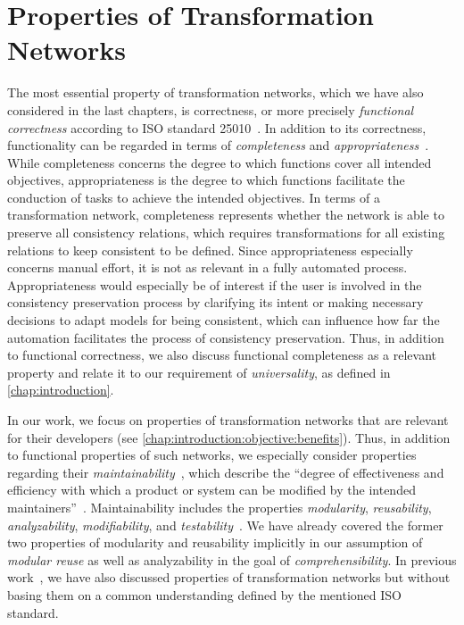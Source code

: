 \section{Properties of Transformation Networks}
\label{chap:classification:properties}

The most essential property of transformation networks, which we have also considered in the last chapters, is correctness, or more precisely \emph{functional correctness} according to ISO standard 25010~\cite[p.~11]{iso25010}.
In addition to its correctness, functionality can be regarded in terms of \emph{completeness} and \emph{appropriateness}~\cite[p.~11]{iso25010}.
While completeness concerns the degree to which functions cover all intended objectives, appropriateness is the degree to which functions facilitate the conduction of tasks to achieve the intended objectives.
In terms of a transformation network, completeness represents whether the network is able to preserve all consistency relations, which requires transformations for all existing relations to keep consistent to be defined.
Since appropriateness especially concerns manual effort, it is not as relevant in a fully automated process. Appropriateness would especially be of interest if the user is involved in the consistency preservation process by clarifying its intent or making necessary decisions to adapt models for being consistent, which can influence how far the automation facilitates the process of consistency preservation.
Thus, in addition to functional correctness, we also discuss functional completeness as a relevant property and relate it to our requirement of \emph{universality}, as defined in \autoref{chap:introduction}.

In our work, we focus on properties of transformation networks that are relevant for their developers (see \autoref{chap:introduction:objective:benefits}).
Thus, in addition to functional properties of such networks, we especially consider properties regarding their \emph{maintainability}~\cite[Tab.~2]{iso25010}, which describe the \enquote{degree of effectiveness and efficiency with which a product or system can be modified by the intended maintainers}~\cite[p.~14]{iso25010}.
Maintainability includes the properties \emph{modularity}, \emph{reusability}, \emph{analyzability}, \emph{modifiability}, and \emph{testability}~\cite[pp.~14]{iso25010}.
We have already covered the former two properties of modularity and reusability implicitly in our assumption of \emph{modular reuse} as well as analyzability in the goal of \emph{comprehensibility}.
In previous work~, we have also discussed properties of transformation networks but without basing them on a common understanding defined by the mentioned ISO standard.


